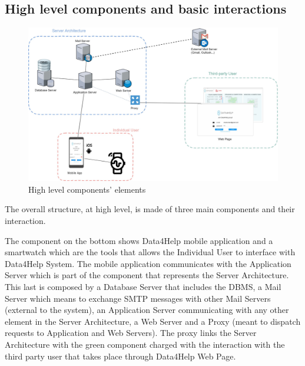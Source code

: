 \subsection{High level components and basic interactions}
\begin{figure}[h]
\caption{High level components' elements}
\includegraphics[width = \textwidth]{sections/architecturalDesign/overview_1.jpg}
\end{figure}

The overall structure, at high level, is made of three main components and their interaction. 

The component on the bottom shows Data4Help mobile application and a smartwatch which are the tools that allows the Individual User to interface with Data4Help System. The mobile application communicates with the Application Server which is part of the component that represents the Server Architecture. 
This last is composed by a Database Server that includes the DBMS, a Mail Server which means to exchange SMTP messages with other Mail Servers (external to the system), an Application Server communicating with any other element in the Server Architecture, a Web Server and a Proxy (meant to dispatch requests to Application and Web Servers). 
The proxy links the Server Architecture with the green component charged with the interaction with the third party user that takes place through Data4Help Web Page. 

